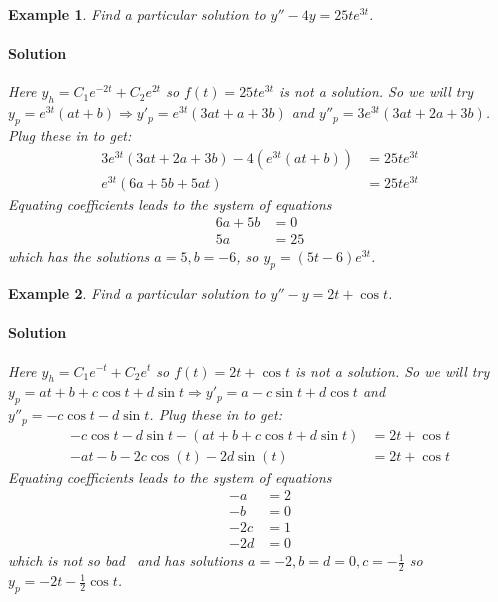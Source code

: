\documentclass[letterpaper, 11pt, openany]{book}
\theoremstyle{mytheoremstyle}
\theoremstyle{myexamplestyle}
\newtheorem{example}{Example}[section]
\newenvironment{solution}{\paragraph{\sffamily \smaller \fontseries{b}\selectfont Solution}}{\hfill\faSquare}
\begin{document}
\begin{example}\label{e:de-undetcoef-Superposition-1}
    Find a particular solution to \(y'' - 4y = 25t e^{3t}\).
    \begin{solution}
        Here \(y_h = C_1 e^{-2t} + C_2 e^{2t}\) so \(f(t)=  25t e^{3t}\) is not a solution. So we will try \(y_p = e^{3t}(at + b) \Rightarrow y'_{p} = e^{3 t} (3 a t+a+3 b)\) and \(y''_p = 3 e^{3 t} (3 a t+2 a+3 b)\). Plug these in to get:
        \begin{align*}
            3 e^{3 t} (3 a t+2 a+3 b) - 4\left(e^{3t}(at + b)\right) &= 25t e^{3t}\\
            e^{3 t} (6 a + 5 b + 5 a t) &= 25t e^{3t}
        \end{align*}
        Equating coefficients leads to the system of equations
        \begin{align*}
            6 a + 5 b &= 0\\
            5a &= 25
        \end{align*}
        which has the solutions \(a = 5, b=-6\), so \(y_p = (5t-6)e^{3t}\).
    \end{solution}
\end{example}

\begin{example}\label{e:de-undetcoef-Superposition-2}
    Find a particular solution to \(y'' - y = 2t + \cos t\).
    \begin{solution}
        Here \(y_h = C_1 e^{-t} + C_2 e^{t}\) so \(f(t)= 2t + \cos t\) is not a solution. So we will try \(y_p = at + b + c \cos t + d \sin t \Rightarrow y'_{p} = a - c \sin t + d \cos t\) and \(y''_p = -c \cos t - d \sin t\). Plug these in to get:
        \begin{align*}
            -c \cos t - d \sin t - (at + b + c \cos t + d \sin t) &= 2t + \cos t\\
            -at - b - 2c \cos (t) - 2d \sin (t) &= 2t + \cos t
        \end{align*}
        Equating coefficients leads to the system of equations
        \begin{align*}
            -a & = 2\\
            -b &= 0\\
            -2c &= 1\\
            -2d & = 0
        \end{align*}
        which is not so bad \faSmile \ and has solutions \(a = -2, b = d = 0, c = -\frac{1}{2}\) so \(y_p = -2t - \frac{1}{2} \cos t\).
    \end{solution}
\end{example}
\end{document}
